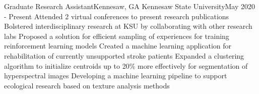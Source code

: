 \resumeSubheading
{Graduate Research Assistant}{Kennesaw, GA}
{Kennesaw State University}{May 2020 - Present}
\resumeItemListStart
\resumeItem
{Attended 2 virtual conferences to present research publications}
\resumeItem
{Bolstered interdisciplinary research at KSU by collaborating with other research labs}
\resumeItem
{Proposed a solution for efficient sampling of experiences for training
    reinforcement learning models}
\resumeItem
{Created a machine learning application for rehabilitation of currently unsupported stroke patients}
\resumeItem
{Expanded a clustering algorithm to initialize centroids up to 20\% more effectively for
    segmentation of hyperspectral images}
\resumeItem
{Developing a machine learning pipeline to support ecological research based on
    texture analysis methods}
\resumeItemListEnd